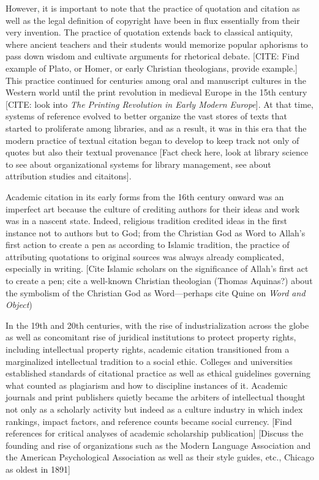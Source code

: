\documentclass{article}
\begin{document}
However, it is important to note that the practice of quotation and citation as well as the legal definition of copyright have been in flux essentially from their very invention. The practice of quotation extends back to classical antiquity, where ancient teachers and their students would memorize popular aphorisms to pass down wisdom and cultivate arguments for rhetorical debate. [CITE: Find example of Plato, or Homer, or early Christian theologians, provide example.] This practice continued for centuries among oral and manuscript cultures in the Western world until the print revolution in medieval Europe in the 15th century [CITE: look into \emph{The Printing Revolution in Early Modern Europe}]. At that time, systems of reference evolved to better organize the vast stores of texts that started to proliferate among libraries, and as a result, it was in this era that the modern practice of textual citation began to develop to keep track not only of quotes but also their textual provenance [Fact check here, look at library science to see about organizational systems for library management, see about attribution studies and citaitons]. 

Academic citation in its early forms from the 16th century onward was an imperfect art because the culture of crediting authors for their ideas and work was in a nascent state. Indeed, religious tradition credited ideas in the first instance not to authors but to God; from the Christian God as Word to Allah’s first action to create a pen as according to Islamic tradition, the practice of attributing quotations to original sources was always already complicated, especially in writing. [Cite Islamic scholars on the significance of Allah’s first act to create a pen; cite a well-known Christian theologian (Thomas Aquinas?) about the symbolism of the Christian God as Word—perhaps cite Quine on \emph{Word and Object})

In the 19th and 20th centuries, with the rise of industrialization across the globe as well as concomitant rise of juridical institutions to protect property rights, including intellectual property rights, academic citation transitioned from a marginalized intellectual tradition to a social ethic. Colleges and universities established standards of citational practice as well as ethical guidelines governing what counted as plagiarism and how to discipline instances of it. Academic journals and print publishers quietly became the arbiters of intellectual thought not only as a scholarly activity but indeed as a culture industry in which index rankings, impact factors, and reference counts became social currency. [Find references for critical analyses of academic scholarship publication] [Discuss the founding and rise of organizations such as the Modern Language Association and the American Psychological Association as well as their style guides, etc., Chicago as oldest in 1891]
\end{document}

